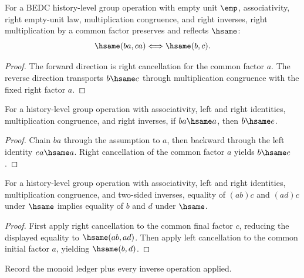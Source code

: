 \begin{theorem}
\label{thm:group-right-mul-cancel-empty-unit-iff}
For a BEDC history-level group operation with empty unit $\emp$,
associativity, right empty-unit law, multiplication congruence, and right
inverses, right multiplication by a common factor preserves and reflects
$\hsame$:
$$
\hsame(ba,ca) \Longleftrightarrow \hsame(b,c).
$$
\end{theorem}
\begin{proof}
The forward direction is right cancellation for the common factor $a$. The
reverse direction transports $b\hsame c$ through multiplication congruence with
the fixed right factor $a$.
\end{proof}

\begin{theorem}
\label{thm:group-right-absorb-left-factor-unit}
For a history-level group operation with associativity, left and right
identities, multiplication congruence, and right inverses, if $ba\hsame a$,
then $b\hsame e$.
\end{theorem}
\begin{proof}
Chain $ba$ through the assumption to $a$, then backward through the left
identity $ea\hsame a$. Right cancellation of the common factor $a$ yields
$b\hsame e$.
\end{proof}

\begin{theorem}
\label{thm:group-two-sided-cancellation}
For a history-level group operation with associativity, left and right
identities, multiplication congruence, and two-sided inverses, equality of
$(ab)c$ and $(ad)c$ under $\hsame$ implies equality of $b$ and $d$ under
$\hsame$.
\end{theorem}
\begin{proof}
First apply right cancellation to the common final factor $c$, reducing the
displayed equality to $\hsame(ab,ad)$. Then apply left cancellation to the
common initial factor $a$, yielding $\hsame(b,d)$.
\end{proof}

\begin{definition}
\label{def:group-ledger-policy}
Record the monoid ledger plus every inverse operation applied.
\end{definition}

